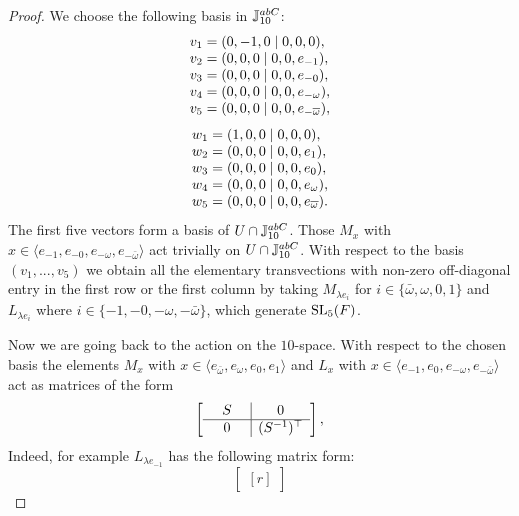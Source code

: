 \begin{proof}
We choose the following basis in $\mathbb{J}_{10}^{abC}$:
	\begin{equation*}
		\begin{array}{r@{\;}c@{\;}l}
			v_1 & = & (0,-1,0 \mid 0,0,0), \\
			v_2 & = & (0,0,0 \mid 0,0, e_{-1}), \\
			v_3 & = & (0,0,0 \mid 0,0, e_{-0}), \\
			v_4 & = & (0,0,0 \mid 0,0, e_{-\omega}), \\
			v_5 & = & (0,0,0 \mid 0,0, e_{-\bar{\omega}}),
		\end{array}
	\end{equation*}
	\begin{equation*}
		\begin{array}{r@{\;}c@{\;}l}
			w_1 & = & (1,0,0 \mid 0,0,0), \\
			w_2 & = & (0,0,0 \mid 0,0,e_1), \\
			w_3 & = & (0,0,0 \mid 0,0,e_0), \\
			w_4 & = & (0,0,0 \mid 0,0,e_{\omega}), \\
			w_5 & = & (0,0,0 \mid 0,0,e_{\bar{\omega}}). 
		\end{array}
	\end{equation*}
	The first five vectors form a basis of $U \cap \mathbb{J}_{10}^{abC}$. Those $M_x$ with $x \in \langle e_{-1}, e_{-0}, e_{-\omega}, e_{-\bar{\omega}}\rangle$ act trivially on $U \cap \mathbb{J}_{10}^{abC}$. With respect to the basis $(v_1, ..., v_5)$
we obtain all the elementary transvections with non-zero 
off-diagonal entry in the first row or the first column by
taking $M_{\lambda e_i}$ for 
$i \in \{\bar{\omega}, \omega, 0, 1\}$ and $L_{\lambda e_i}$ where
$i \in \{-1, -0, -\omega, -\bar{\omega}\}$, which generate
$\mathrm{SL}_5(F)$.	
	
Now we are going back to the action on the $10$-space. 
With respect to the chosen basis the elements 
	$M_x$ with $x \in \langle e_{\bar{\omega}}, e_{\omega}, e_0, e_1 \rangle$ and 
	$L_x$ with $x \in \langle e_{-1}, e_0, e_{-\omega}, e_{-\bar{\omega}} \rangle$ act as 
 matrices of the form 
	\begin{equation*}
		\left[
			\begin{array}{@{\;\;\;\;\;}c@{\;\;\;\;\;}|c}
				S & 0 \\ \hline
				0 & (S^{-1})^{\T}
			\end{array}
		\right],
	\end{equation*}
	Indeed, for example $L_{\lambda e_{-1}}$ has the following matrix form:
	\begin{equation*}
	\begin{bmatrix}[r]
	

\end{bmatrix}
\end{equation*}
\end{proof}
